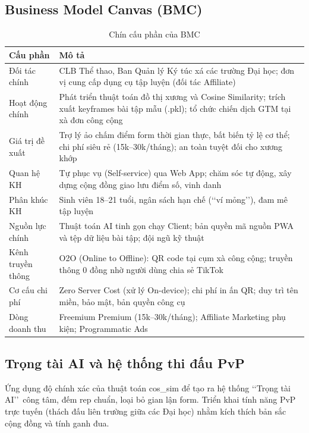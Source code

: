 \documentclass[a4paper,12pt]{article}
\begin{document}
\subsection{Business Model Canvas (BMC)}
\begin{table}[H]
    \centering
    \caption{Chín cấu phần của BMC}
    \label{tab:bmc}
    \begin{tabular}{|p{2.8cm}|p{11.2cm}|}
        \hline
        \textbf{Cấu phần} & \textbf{Mô tả} \\
        \hline\hline
        Đối tác chính & CLB Thể thao, Ban Quản lý Ký túc xá các trường Đại học; đơn vị cung cấp dụng cụ tập luyện (đối tác Affiliate) \\
        \hline
        Hoạt động chính & Phát triển thuật toán đồ thị xương và Cosine Similarity; trích xuất keyframes bài tập mẫu (.pkl); tổ chức chiến dịch GTM tại xà đơn công cộng \\
        \hline
        Giá trị đề xuất & Trợ lý ảo chấm điểm form thời gian thực, bất biến tỷ lệ cơ thể; chi phí siêu rẻ (15k--30k/tháng); an toàn tuyệt đối cho xương khớp \\
        \hline
        Quan hệ KH & Tự phục vụ (Self-service) qua Web App; chăm sóc tự động, xây dựng cộng đồng giao lưu điểm số, vinh danh \\
        \hline
        Phân khúc KH & Sinh viên 18--21 tuổi, ngân sách hạn chế (\lq\lq ví mỏng\rq\rq), đam mê tập luyện \\
        \hline
        Nguồn lực chính & Thuật toán AI tinh gọn chạy Client; bản quyền mã nguồn PWA và tệp dữ liệu bài tập; đội ngũ kỹ thuật \\
        \hline
        Kênh truyền thông & O2O (Online to Offline): QR code tại cụm xà công cộng; truyền thông 0 đồng nhờ người dùng chia sẻ TikTok \\
        \hline
        Cơ cấu chi phí & Zero Server Cost (xử lý On-device); chi phí in ấn QR; duy trì tên miền, bảo mật, bản quyền công cụ \\
        \hline
        Dòng doanh thu & Freemium Premium (15k--30k/tháng); Affiliate Marketing phụ kiện; Programmatic Ads \\
        \hline
    \end{tabular}
\end{table}

\subsection{Trọng tài AI và hệ thống thi đấu PvP}
Ứng dụng độ chính xác của thuật toán cos\_sim để tạo ra hệ thống \lq\lq Trọng tài AI\rq\rq\ công tâm, đếm rep chuẩn, loại bỏ gian lận form. Triển khai tính năng PvP trực tuyến (thách đấu liên trường giữa các Đại học) nhằm kích thích bản sắc cộng đồng và tính ganh đua.
\end{document}
